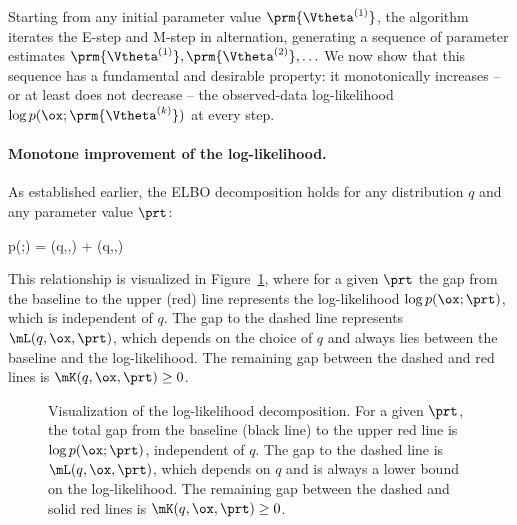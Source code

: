 Starting from any initial parameter value $\prm{\Vtheta^{(1)}}$, the algorithm iterates the E-step and M-step in alternation, generating a sequence of parameter estimates $\prm{\Vtheta^{(1)}}, \prm{\Vtheta^{(2)}}, \ldots$ We now show that this sequence has a fundamental and desirable property: it monotonically increases -- or at least does not decrease -- the observed-data log-likelihood $\log p(\ox;\prm{\Vtheta^{(k)}})$ at every step.

\paragraph{Monotone improvement of the log-likelihood.} As established earlier, the ELBO decomposition holds for any distribution $q$ and any parameter value $\prt$:
\begin{myequation}
\log p(\ox;\prt) = \mL(q,\ox,\prt) + \mK(q,\ox,\prt)
\end{myequation}
This relationship is visualized in Figure~\ref{fig11}, where for a given $\prt$ the gap from the baseline to the upper (red) line represents the log-likelihood $\log p(\ox;\prt)$, which is independent of $q$. The gap to the dashed line represents $\mL(q,\ox,\prt)$, which depends on the choice of $q$ and always lies between the baseline and the log-likelihood. The remaining gap between the dashed and red lines is $\mK(q,\ox,\prt) \geq 0$.

\begin{figure}[ht]
\begin{center}
\caption{Visualization of the log-likelihood decomposition. For a given $\prt$, the total gap from the baseline (black line) to the upper red line is $\log p(\ox;\prt)$, independent of $q$. The gap to the dashed line is $\mL(q,\ox,\prt)$, which depends on $q$ and is always a lower bound on the log-likelihood. The remaining gap between the dashed and solid red lines is $\mK(q,\ox,\prt) \geq 0$.}\label{fig11}
\end{center}
\end{figure}

